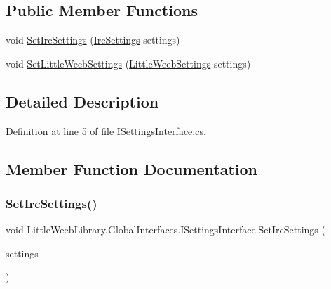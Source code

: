 \subsection*{Public Member Functions}
\begin{DoxyCompactItemize}
\item 
void \mbox{\hyperlink{interface_little_weeb_library_1_1_global_interfaces_1_1_i_settings_interface_a9ddf06e247a96d757482b37ddb070e3d}{Set\+Irc\+Settings}} (\mbox{\hyperlink{class_little_weeb_library_1_1_settings_1_1_irc_settings}{Irc\+Settings}} settings)
\item 
void \mbox{\hyperlink{interface_little_weeb_library_1_1_global_interfaces_1_1_i_settings_interface_a5c53e44105f1f4c7f8c3e546d29939d7}{Set\+Little\+Weeb\+Settings}} (\mbox{\hyperlink{class_little_weeb_library_1_1_settings_1_1_little_weeb_settings}{Little\+Weeb\+Settings}} settings)
\end{DoxyCompactItemize}


\subsection{Detailed Description}


Definition at line 5 of file I\+Settings\+Interface.\+cs.



\subsection{Member Function Documentation}
\mbox{\label{interface_little_weeb_library_1_1_global_interfaces_1_1_i_settings_interface_a9ddf06e247a96d757482b37ddb070e3d}} 
\subsubsection{\texorpdfstring{Set\+Irc\+Settings()}{SetIrcSettings()}}
{\footnotesize\ttfamily void Little\+Weeb\+Library.\+Global\+Interfaces.\+I\+Settings\+Interface.\+Set\+Irc\+Settings (\begin{DoxyParamCaption}\item[{\mbox{\hyperlink{class_little_weeb_library_1_1_settings_1_1_irc_settings}{Irc\+Settings}}}]{settings }\end{DoxyParamCaption})}



